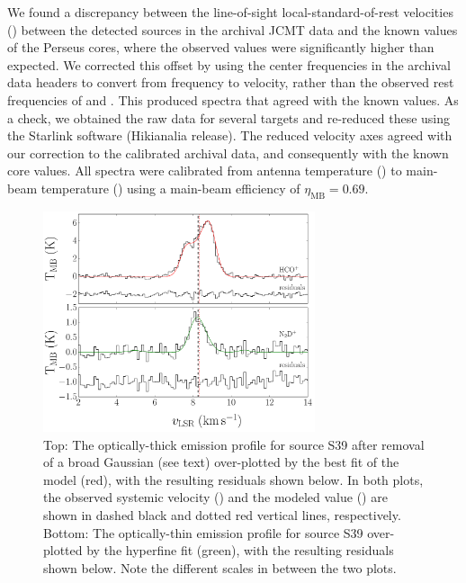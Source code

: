 \documentclass[iop,twocolappendix]{emulateapj}
\begin{document}
We found a discrepancy between the line-of-sight local-standard-of-rest velocities (\VLSR) between the detected sources in the archival JCMT data and the known values of the Perseus cores, where the observed {\VLSR} values were significantly higher than expected. We corrected this offset by using the center frequencies in the archival data headers to convert from frequency to velocity, rather than the observed rest frequencies of {\HCO} and {\NtD}. This produced spectra that agreed with the known {\VLSR} values. As a check, we obtained the raw data for several targets and re-reduced these using the Starlink software (Hikianalia release). The reduced velocity axes agreed with our correction to the calibrated archival data, and consequently with the known core {\VLSR} values. All spectra were calibrated from antenna temperature ({\Atemp}) to main-beam temperature ({\TMB}) using a main-beam efficiency of ${\eta}_\mathrm{MB}=0.69$. 

\begin{figure}[h]
\begin{center}
\includegraphics[width=8cm]{ExSpectra.pdf}
\caption{Top: The optically-thick {\HCO} emission profile for source S39 after removal of a broad Gaussian (see text) over-plotted by the best fit of the {\Hill} model (red), with the resulting residuals shown below. In both plots, the observed systemic velocity ({\Vthin}) and the modeled value ({\Vmod}) are shown in dashed black and dotted red vertical lines, respectively.
%
Bottom: The optically-thin {\NtD} emission profile for source S39 over-plotted by the hyperfine fit (green), with the resulting residuals shown below.
%
Note the different scales in {\TMB} between the two plots.} 
\label{fig:examplespectra}
\end{center}
\end{figure}
\end{document}
